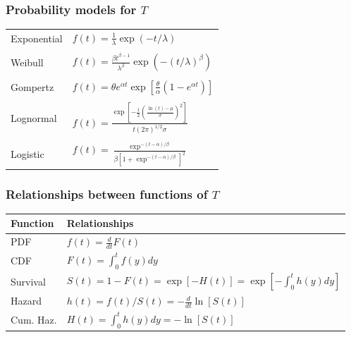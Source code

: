 \begin{frame}
\frametitle{Probability models for $T$}
\begin{tabular}{ll}
Exponential & $f(t)=\frac{1}{\lambda} \exp(-t/\lambda)$ \\
[1ex] \\
Weibull & $f(t)=\frac{\beta t^{\beta-1}}{\lambda^{\beta}}\exp(-(t/\lambda)^\beta)$ \\
[1ex] \\
Gompertz & $f(t)=\theta e^{\alpha t}\exp\left[\frac{\theta}{\alpha}\left(1-e^{\alpha t}\right)  \right]$ \\
[1ex] \\
Lognormal & $f(t)=\frac{\exp\left[ -\frac{1}{2}\left(\frac{\ln(t)-\mu}{\sigma} \right)^2 \right]}{t(2\pi)^{1/2}\sigma}$ \\
[1ex] \\
Logistic & $f(t) = \frac{\exp^{-(t-\alpha)/\beta}} {\beta \left[1 + \exp^{-(t-\alpha)/\beta} \right]^2}$ \\
\end{tabular}
\end{frame}

\begin{frame}
\frametitle{Relationships between functions of $T$}
{\renewcommand{\arraystretch}{1.8}
\begin{tabular}{ll}
\hline
Function & Relationships  \\
\hline
PDF & ${f(t)=\frac{d}{dt}F(t)}$\\
CDF  & ${F(t)=\int_0^t f(y)dy}$\\
Survival & ${S(t)=1-F(t)=\exp[-H(t)]=\exp[-\int_0^th(y)dy]}$ \\
Hazard & ${h(t)=f(t)/S(t)=-\frac{d}{dt}\ln[S(t)]}$ \\
Cum. Haz. & ${H(t)=\int_0^t h(y)dy=-\ln[S(t)]}$\\
\hline
\end{tabular}}
\end{frame}

 